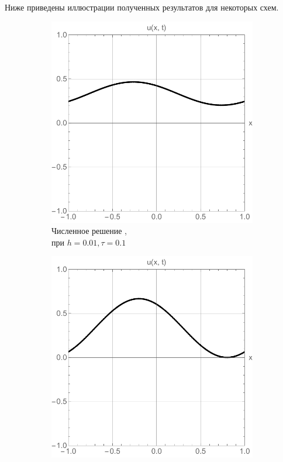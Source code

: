 \documentclass[12pt, a4paper]{article}
\begin{document}
Ниже приведены иллюстрации полученных результатов для некоторых схем.
\begin{figure}[!hp]
	\centering
	\begin{subfigure}[t]{0.32\textwidth}
		\centering
		\includegraphics[width=\textwidth]{res1_2}
		\caption{Численное решение , \\при $h = 0.01, \tau = 0.1$ }
		\label{test1}
	\end{subfigure}
	\hfill
	\begin{subfigure}[t]{0.32\textwidth}
		\centering
		\includegraphics[width=\textwidth]{res1_1}

\end{subfigure}
\end{figure}
\end{document}
